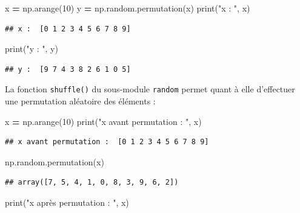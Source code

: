 \documentclass[
  12pt,
]{book}
\newenvironment{Shaded}{\begin{snugshade}}{\end{snugshade}}
\newcommand{\BuiltInTok}[1]{#1}
\newcommand{\DecValTok}[1]{\textcolor[rgb]{0.00,0.00,0.81}{#1}}
\newcommand{\NormalTok}[1]{#1}
\newcommand{\OperatorTok}[1]{\textcolor[rgb]{0.81,0.36,0.00}{\textbf{#1}}}
\newcommand{\StringTok}[1]{\textcolor[rgb]{0.31,0.60,0.02}{#1}}
\numberwithin{equation}{section}
\numberwithin{countremarque}{section}
\begin{document}
\begin{Shaded}
\begin{Highlighting}[]
\NormalTok{x }\OperatorTok{=}\NormalTok{ np.arange(}\DecValTok{10}\NormalTok{)}
\NormalTok{y }\OperatorTok{=}\NormalTok{ np.random.permutation(x)}
\BuiltInTok{print}\NormalTok{(}\StringTok{"x : "}\NormalTok{, x)}
\end{Highlighting}
\end{Shaded}

\begin{lstlisting}
## x :  [0 1 2 3 4 5 6 7 8 9]
\end{lstlisting}

\begin{Shaded}
\begin{Highlighting}[]
\BuiltInTok{print}\NormalTok{(}\StringTok{"y : "}\NormalTok{, y)}
\end{Highlighting}
\end{Shaded}

\begin{lstlisting}
## y :  [9 7 4 3 8 2 6 1 0 5]
\end{lstlisting}

La fonction \texttt{shuffle()} du sous-module \texttt{random} permet quant à elle d'effectuer une permutation aléatoire des éléments :

\begin{Shaded}
\begin{Highlighting}[]
\NormalTok{x }\OperatorTok{=}\NormalTok{ np.arange(}\DecValTok{10}\NormalTok{)}
\BuiltInTok{print}\NormalTok{(}\StringTok{"x avant permutation : "}\NormalTok{, x)}
\end{Highlighting}
\end{Shaded}

\begin{lstlisting}
## x avant permutation :  [0 1 2 3 4 5 6 7 8 9]
\end{lstlisting}

\begin{Shaded}
\begin{Highlighting}[]
\NormalTok{np.random.permutation(x)}
\end{Highlighting}
\end{Shaded}

\begin{lstlisting}
## array([7, 5, 4, 1, 0, 8, 3, 9, 6, 2])
\end{lstlisting}

\begin{Shaded}
\begin{Highlighting}[]
\BuiltInTok{print}\NormalTok{(}\StringTok{"x après permutation : "}\NormalTok{, x)}
\end{Highlighting}
\end{Shaded}
\end{document}
